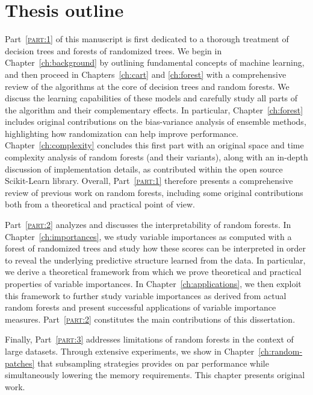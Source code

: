 \section{Thesis outline}

Part~\textsc{\ref{part:1}} of this manuscript is first dedicated to a thorough
treatment of decision trees and forests of randomized trees. We begin in
Chapter~\ref{ch:background} by outlining fundamental concepts of machine
learning, and then proceed in Chapters~\ref{ch:cart} and \ref{ch:forest} with a
comprehensive review of the algorithms at the core of decision trees and random
forests. We discuss the learning capabilities of these models and carefully
study all parts of the algorithm and their complementary effects. In particular,
Chapter~\ref{ch:forest} includes original contributions on the bias-variance
analysis of ensemble methods, highlighting how randomization can help improve
performance. Chapter~\ref{ch:complexity} concludes this first part with an
original space and time complexity analysis of random forests (and their
variants), along with an in-depth discussion of implementation details,
as contributed within the open source Scikit-Learn library.
Overall, Part~\textsc{\ref{part:1}} therefore presents a comprehensive review
of previous work on random forests, including some original contributions
both from a theoretical and practical point of view.

Part~\textsc{\ref{part:2}} analyzes and discusses the interpretability of
random forests. In Chapter~\ref{ch:importances}, we study variable importances
as computed with a forest of randomized trees and study how these scores can be
interpreted in order to reveal the underlying predictive structure learned from
the data. In particular, we derive a theoretical framework from which we prove
theoretical and practical properties of variable importances. In
Chapter~\ref{ch:applications}, we then exploit this framework to further study
variable importances as derived from actual random forests and present
successful applications of variable importance measures.
Part~\textsc{\ref{part:2}} constitutes the main contributions of this
dissertation.

Finally, Part~\textsc{\ref{part:3}} addresses limitations of random forests in
the context of large datasets. Through extensive experiments, we show in
Chapter~\ref{ch:random-patches} that subsampling strategies provides on par
performance while simultaneously lowering the memory requirements. This
chapter presents original work.

